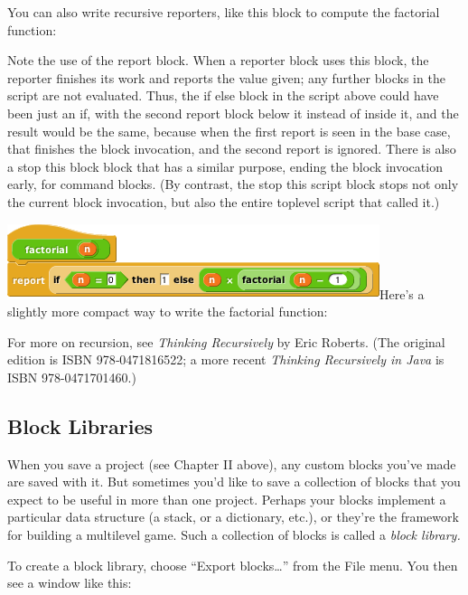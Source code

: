 You can also write recursive reporters, like this block to compute the
factorial function:

Note the use of the report block. When a reporter block uses this block,
the reporter finishes its work and reports the value given; any further
blocks in the script are not evaluated. Thus, the if else block in the
script above could have been just an if, with the second report block
below it instead of inside it, and the result would be the same, because
when the ﬁrst report is seen in the base case, that finishes the block
invocation, and the second report is ignored. There is also a stop this
block block that has a similar purpose, ending the block invocation
early, for command blocks. (By contrast, the stop this script block
stops not only the current block invocation, but also the entire
toplevel script that called it.)

\includegraphics[width=4.29167in,height=0.86458in]{media/image521.png}Here's
a slightly more compact way to write the factorial function:

For more on recursion, see \emph{Thinking Recursively} by Eric Roberts.
(The original edition is ISBN 978‑0471816522; a more recent
\emph{Thinking Recursively in Java} is ISBN 978-0471701460.)

\subsection{Block Libraries}\label{block-libraries}

When you save a project (see Chapter II above), any custom blocks you've
made are saved with it. But sometimes you'd like to save a collection of
blocks that you expect to be useful in more than one project. Perhaps
your blocks implement a particular data structure (a stack, or a
dictionary, etc.), or they're the framework for building a multilevel
game. Such a collection of blocks is called a \emph{block library.}

\emph{\hfill\break
}To create a block library, choose ``Export blocks\ldots'' from the File
menu. You then see a window like this:

